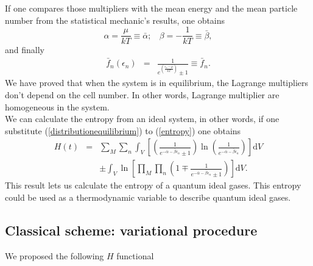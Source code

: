 \documentclass{article}
\begin{document}
If one compares those multipliers with the mean energy and the mean particle number from the statistical mechanic's results, one obtains
\begin{equation}
    \alpha=\frac{\mu}{kT}\equiv \bar{\alpha}; \ \ \ \ \beta=-\frac{1}{kT}\equiv \bar{\beta},
\end{equation}{}
and finally
\begin{eqnarray}
    \bar{f}_{n}(\epsilon_{n})&=&\frac{1}{e^{(\frac{{\epsilon_n}-\bar{\mu}}{kT})}\pm 1}\equiv \bar{f}_{n}.
\end{eqnarray}{}
We have proved that when the system is in equilibrium, the Lagrange multipliers don't depend on the cell number. In other words, Lagrange multiplier are homogeneous in the system.\\
We can calculate the entropy from an ideal system, in other words, if one substitute (\ref{distributionequilibrium}) to (\ref{entropy}) one obtains
\begin{eqnarray}
      H(t)&=&\sum_M \sum_n \int_V \left[\left(\frac{1}{e^{-\bar{\alpha}-\bar{\beta}\epsilon_{n}}\pm 1} \right)\ln \left(\frac{1}{e^{-\bar{\alpha}-\bar{\beta}\epsilon_{n}}} \right) \right]\mathrm{d}V\nonumber \\
      &&\pm \int_V \ln \left[\prod_{M} \prod_{n}\left(1 \mp \frac{1}{e^{-\bar{\alpha}-\bar{\beta}\epsilon_{n}}\pm 1} \right) \right]\mathrm{d}V\label{H-entropy}.
  \end{eqnarray}
  This result lets us calculate the entropy of a quantum ideal gases. This entropy could be used as a thermodynamic variable to describe quantum ideal gases.
\subsection{Classical scheme: variational procedure}
We proposed the following $H$ functional
\end{document}

